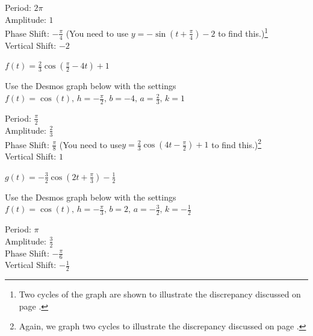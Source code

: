\documentclass{ximera}
\begin{document}
\begin{question}
\begin{problem}
\begin{solution}
\begin{center} 
\end{center}

Period: $2\pi$\\
Amplitude: $1$\\
Phase Shift: $-\frac{\pi}{4}$ (You need to use $y = -\sin \left( t + \frac{\pi}{4} \right) - 2 $ to find this.)\footnote{Two cycles of the graph are shown to illustrate the discrepancy discussed on page \pageref{phaseshiftissue}.}\\
Vertical Shift: $-2$\\

\end{solution}
\end{problem}

\begin{problem}
$f(t) = \frac{2}{3} \cos \left( \frac{\pi}{2} - 4t \right) + 1$

\begin{solution}
Use the Desmos graph below with the settings $f(t)=\cos(t),\,h=-\frac{\pi}{2},\,b=-4,\,a=\frac{2}{3},\,k=1$

\begin{center} 
\end{center}

Period: $\frac{\pi}{2}$\\
Amplitude: $\frac{2}{3}$\\ 
Phase Shift: $\frac{\pi}{8}$ (You need to use$y = \frac{2}{3} \cos \left( 4t - \frac{\pi}{2} \right) + 1$ to find this.)\footnote{Again, we graph two cycles to illustrate the discrepancy discussed on page \pageref{phaseshiftissue}.}\\
Vertical Shift: $1$\\
\end{solution}
\end{problem}

\begin{problem}
$g(t) = -\frac{3}{2} \cos \left( 2t + \frac{\pi}{3} \right) - \frac{1}{2}$

\begin{solution}
Use the Desmos graph below with the settings $f(t)=\cos(t),\,h=-\frac{\pi}{3},\,b=2,\,a=-\frac{3}{2},\,k=-\frac{1}{2}$

\begin{center} 
\end{center}

Period: $\pi$\\
Amplitude: $\frac{3}{2}$\\
Phase Shift: $-\frac{\pi}{6}$\\
Vertical Shift: $-\frac{1}{2}$\\
\end{solution}
\end{problem}



\end{question}
\end{document}
